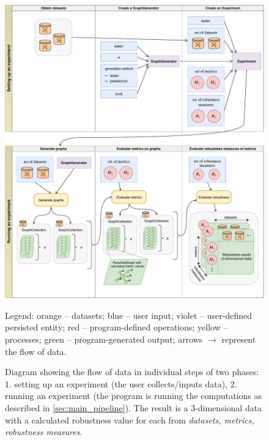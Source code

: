 \begin{figure}
    \includegraphics[width=\linewidth]{main_data_flow.pdf}
    \caption{Diagram showing the flow of data in individual steps of two phases: 1. setting up an experiment (the user collects/inputs data), 2. running an experiment (the program is running the computations as described in \autoref{sec:main_pipeline}). The result is a 3-dimensional data with a calculated robustness value for each from \textsl{datasets, metrics, robustness measures}.}\label{fig:main_data_flow}
    \begin{flushleft}\footnotesize
    Legend: \textcolor{diag-orange}{orange} -- datasets; \textcolor{diag-blue}{blue} -- user input; \textcolor{diag-violet}{violet} -- user-defined persisted entity; \textcolor{diag-red}{red} -- program-defined operations; \textcolor{diag-yellow}{yellow} -- processes; \textcolor{diag-green}{green} -- program-generated output; arrows $\rightarrow$ represent the flow of data.
    \end{flushleft}
\end{figure}
